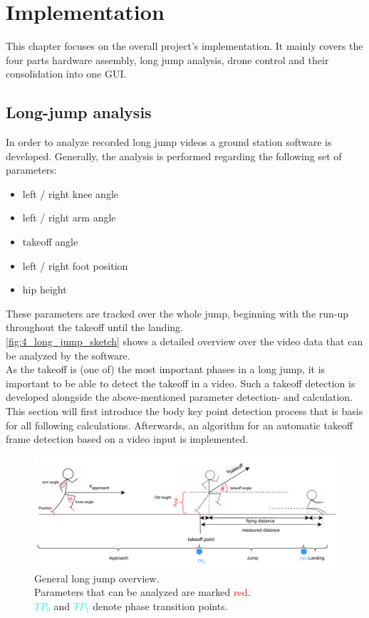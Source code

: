 \graphicspath{{./figures/}}
\chapter{Implementation}
This chapter focuses on the overall project's implementation.
It mainly covers the four parts hardware assembly, long jump analysis,
drone control and their consolidation into one \ac{GUI}.

\section{Long-jump analysis}\label{sec:4_analysis_software}
In order to analyze recorded long jump videos a ground station software is
developed.
Generally, the analysis is performed regarding the following set of
parameters:
\begin{itemize}
    \item left / right knee angle
    \item left / right arm angle
    \item takeoff angle
    \item left / right foot position
    \item hip height
\end{itemize}
These parameters are tracked over the whole jump, beginning with the run-up
throughout the takeoff until the landing.\\
\autoref{fig:4_long_jump_sketch} shows a detailed overview over the video data
that can be analyzed by the software.\\
As the takeoff is (one of) the most important phases in a long jump, it is
important to be able to detect the takeoff in a video.
Such a takeoff detection is developed alongside the above-mentioned parameter 
detection- and calculation.\\
This section will first introduce the body key point detection process that
is basis for all following calculations.
Afterwards, an algorithm for an automatic takeoff frame detection based on a
video input is implemented.
\begin{figure}[!h]
    \centering
    \includegraphics[scale=0.6]{long_jump_sketch.pdf}
    \caption[Long jump parameter overview]{General long jump overview.\\
    Parameters that can be analyzed are marked \textcolor{red}{red}.\\
    \textcolor{cyan}{$TP_0$} and \textcolor{cyan}{$TP_1$} denote phase
    transition points.}
    \label{fig:4_long_jump_sketch}
\end{figure}
\FloatBarrier

